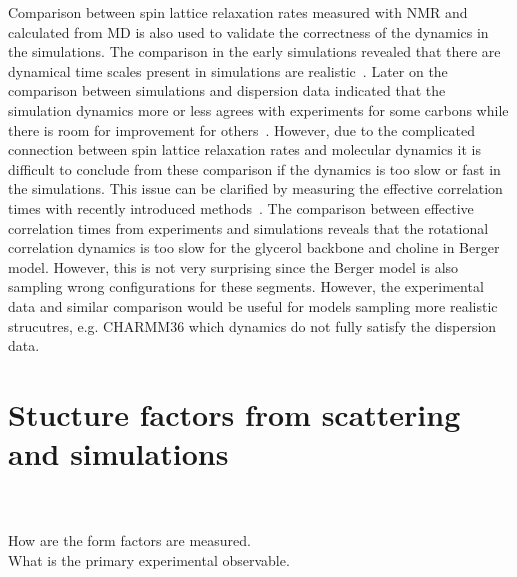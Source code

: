 \documentclass[aps,prl,superscriptaddress,twocolumn]{revtex4}
\begin{document}
Comparison between spin lattice relaxation rates measured with NMR and calculated from MD
is also used to validate the correctness of the dynamics in the simulations.
The comparison in the early simulations revealed that there are dynamical
time scales present in simulations are realistic~\cite{??}. Later on the 
comparison between simulations and dispersion data indicated that the
simulation dynamics more or less agrees with experiments for some carbons
while there is room for improvement for others~\cite{??}. However, due to
the complicated connection between spin lattice relaxation rates and molecular dynamics
it is difficult to conclude from these comparison if the dynamics is too slow or
fast in the simulations. This issue can be clarified by measuring the effective correlation
times with recently introduced methods~\cite{ferreira15}. The comparison between 
effective correlation times from experiments and simulations reveals that
the rotational correlation dynamics is too slow for the glycerol backbone and choline 
in Berger model. However, this is not very surprising since the Berger model is also sampling wrong configurations for
these segments. However, the experimental data and similar comparison would be useful
for models sampling more realistic strucutres, e.g. CHARMM36 which dynamics do not fully
satisfy the dispersion data.




\newpage
\onecolumngrid

\section{Stucture factors from scattering and simulations}

 \\[0.1cm]

\\[0.1cm]

\noindent How are the form factors are measured.\\
What is the primary experimental observable. \\

  \\

\end{document}
